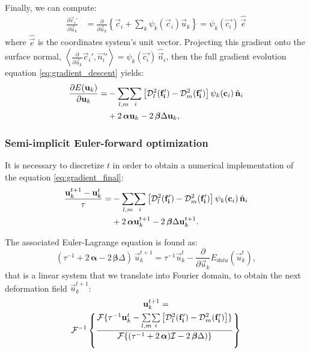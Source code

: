 Finally, we can compute:
\begin{align}
\frac{\partial \vec{c}_i'}{\partial \vec{u}_k} &= \frac{\partial}{\partial \vec{u}_k} 
\left\{ \vec{c}_i + \sum_k \psi_k(\vec{c}_i) \vec{u}_k \right\} 
= \psi_k(\vec{c_i})\, \hat{\vec{e}}
\end{align}
where $\hat{\vec{e}}$ is the coordinates system's unit vector.
Projecting this gradient onto the surface normal,
$\left\langle \frac{\partial}{\partial \vec{u}_k}{\vec{c}_i}', \vec{n_i}'\right\rangle
= \psi_k(\vec{c_i})\, \hat{\vec{n}}_i$, then the
full gradient evolution equation \eqref{eq:gradient_descent} yields:
\begin{align}
\frac{\partial E(\vec{u}_k)}{\partial \vec{u}_k} =
&- \underset{l,m}{\sum} \underset{i}{\sum}
\left[ \mdist{f_i'}{l} - \mdist{f_i'}{m} \right]
\psi_k(\vec{c}_i)\, \hat{\vec{n}}_i \notag\\
&+2\, \boldsymbol{\alpha} \vec{u}_k
-2\, \boldsymbol{\beta} \Delta \vec{u}_k,
\label{eq:gradient_final}
\end{align}

\subsubsection{Semi-implicit Euler-forward optimization}
It is necessary to discretize $t$ in order to obtain a numerical
implementation of the equation \eqref{eq:gradient_final}:
\begin{align}
\frac{\vec{u}_k^{t+1}-\vec{u}_k^t}{\tau} =
&- \underset{l,m}{\sum} \underset{i}{\sum}
\left[ \mdist{f_i'}{l} - \mdist{f_i'}{m}\right]
\psi_k(\vec{c}_i)\, \hat{\vec{n}}_i \notag\\
&+2\, \boldsymbol{\alpha} \vec{u}_k^{t+1}
-2\, \boldsymbol{\beta} \Delta \vec{u}_k^{t+1}.
\end{align}

The associated Euler-Lagrange equation is found as:
\begin{equation}
(\tau^{-1} +2\, \boldsymbol{\alpha} - 2\, \boldsymbol{\beta} \Delta )\, \vec{u}_k^{t+1} = 
\tau^{-1} \vec{u}_k^t - \frac{\partial}{\partial \vec{u}_k} E_{data}(\vec{u}_k^t),
\end{equation}
that is a linear system that we translate into Fourier domain,
to obtain the next deformation field $\vec{u}_k^{t+1}$:
\begin{multline}
\vec{u}_k^{t+1} = \\
 \mathcal{F}^{-1} \left\lbrace
\frac{\mathcal{F}\lbrace \tau^{-1}\vec{u}_{k}^{t} - \underset{l,m}{\sum} \underset{i}{\sum}
\left[ \mdist{f_i'}{l} - \mdist{f_i'}{m}\right] \rbrace}
     {\mathcal{F}\lbrace (\tau^{-1} +2\,\boldsymbol{\alpha})\mathcal{I} - 2\,\boldsymbol{\beta} \Delta ) \rbrace}
     \right\rbrace
\end{multline}

